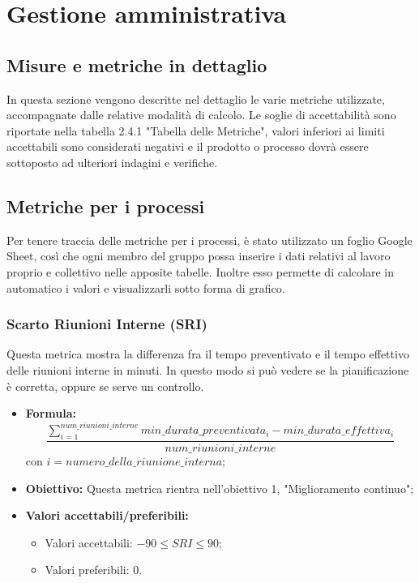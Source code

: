 \section{Gestione amministrativa}
\subsection{Misure e metriche in dettaglio}
In questa sezione vengono descritte nel dettaglio le varie metriche utilizzate, accompagnate dalle relative modalità di calcolo.
Le soglie di accettabilità sono riportate nella tabella 2.4.1 "Tabella delle Metriche", valori inferiori ai limiti accettabili sono considerati negativi e il prodotto o processo dovrà essere sottoposto ad ulteriori indagini e verifiche.
\subsection{Metriche per i processi}
Per tenere traccia delle metriche per i processi, è stato utilizzato un foglio Google Sheet, così che ogni membro del gruppo possa inserire i dati relativi al lavoro proprio e collettivo nelle apposite tabelle. Inoltre esso permette di calcolare in automatico i valori e visualizzarli sotto forma di grafico.

\subsubsection{Scarto Riunioni Interne (SRI)}
Questa metrica mostra la differenza fra il tempo preventivato e il tempo effettivo delle riunioni interne in minuti. In questo modo si può vedere se la pianificazione è corretta, oppure se serve un controllo.
\begin{itemize}
	\item {\textbf{Formula: }}
		\[\frac{\sum_{i=1}^{num\_riunioni\_interne}min\_durata\_preventivata_i-min\_durata\_effettiva_i}{num\_riunioni\_interne}\]
		con $i = {numero\_della\_riunione\_interna}$;
	\item {\textbf{Obiettivo: }}Questa metrica rientra nell'obiettivo 1, "Miglioramento continuo";
	\item {\textbf{Valori accettabili/preferibili: }} 
		\begin{itemize}
			\item Valori accettabili: $-90 \leq SRI \leq 90$;
			\item Valori preferibili: 0.
		\end{itemize}
\end{itemize}

